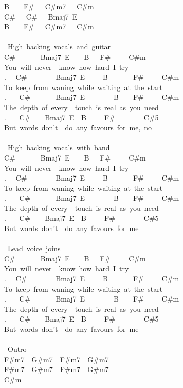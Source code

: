 {B\ \ \ \ F\#\ \ \ C\#m7\ \ \ C\#m\\
C\#\ \ \ C\#\ \ \ Bmaj7\ E\\
B\ \ \ \ F\#\ \ \ C\#m7\ \ \ C\#m\\
\\
\lbrack\ High\ backing\ vocals\ and\ guitar\rbrack\\
C\#\ \ \ \ \ \ \ Bmaj7\ E\ \ \ \ B\ \ \ F\#\ \ \ \ \ C\#m\\
You\ will\ never\ \ know\ how\ hard\ I\ try\\
. \ \ C\#\ \ \ \ \ \ \ \ Bmaj7\ E\ \ \ \ \ B\ \ \ \ \ \ \ F\#\ \ \ \ \ C\#m\\
To\ keep\ from\ waning\ while\ waiting\ at\ the\ start\\
. \ \ \ C\#\ \ \ \ \ \ \ Bmaj7\ E\ \ \ \ \ \ \ \ B\ \ \ \ F\#\ \ \ \ \ C\#m\\
The\ depth\ of\ every\ \ touch\ is\ real\ as\ you\ need\\
. \ \ \ C\#\ \ \ \ Bmaj7\ E\ \ B\ \ \ \ \ F\#\ \ \ \ \ \ \ \ C\#5\\
But\ words\ don't\ \ do\ any\ favours\ for\ me,\ no\\
\\
\lbrack\ High\ backing\ vocals\ with\ band\rbrack\\
C\#\ \ \ \ \ \ \ Bmaj7\ E\ \ \ \ B\ \ \ F\#\ \ \ \ \ C\#m\\
You\ will\ never\ \ know\ how\ hard\ I\ try\\
. \ \ C\#\ \ \ \ \ \ \ \ Bmaj7\ E\ \ \ \ \ B\ \ \ \ \ \ \ F\#\ \ \ \ \ C\#m\\
To\ keep\ from\ waning\ while\ waiting\ at\ the\ start\\
. \ \ \ C\#\ \ \ \ \ \ \ Bmaj7\ E\ \ \ \ \ \ \ \ B\ \ \ \ F\#\ \ \ \ \ C\#m\\
The\ depth\ of\ every\ \ touch\ is\ real\ as\ you\ need\\
. \ \ \ C\#\ \ \ \ Bmaj7\ E\ \ B\ \ \ \ \ F\#\ \ \ \ \ \ \ \ C\#5\\
But\ words\ don't\ \ do\ any\ favours\ for\ me\\
\\
\lbrack\ Lead\ voice\ joins\rbrack\\
C\#\ \ \ \ \ \ \ Bmaj7\ E\ \ \ \ B\ \ \ F\#\ \ \ \ \ C\#m\\
You\ will\ never\ \ know\ how\ hard\ I\ try\\
. \ \ C\#\ \ \ \ \ \ \ \ Bmaj7\ E\ \ \ \ \ B\ \ \ \ \ \ \ F\#\ \ \ \ \ C\#m\\
To\ keep\ from\ waning\ while\ waiting\ at\ the\ start\\
. \ \ \ C\#\ \ \ \ \ \ \ Bmaj7\ E\ \ \ \ \ \ \ \ B\ \ \ \ F\#\ \ \ \ \ C\#m\\
The\ depth\ of\ every\ \ touch\ is\ real\ as\ you\ need\\
. \ \ \ C\#\ \ \ \ Bmaj7\ E\ \ B\ \ \ \ \ F\#\ \ \ \ \ \ \ \ C\#5\\
But\ words\ don't\ \ do\ any\ favours\ for\ me\\
\\
\lbrack\ Outro\rbrack\\
F\#m7\ \ G\#m7\ \ F\#m7\ \ G\#m7\\
F\#m7\ \ G\#m7\ \ F\#m7\ \ G\#m7\\
C\#m\ }
